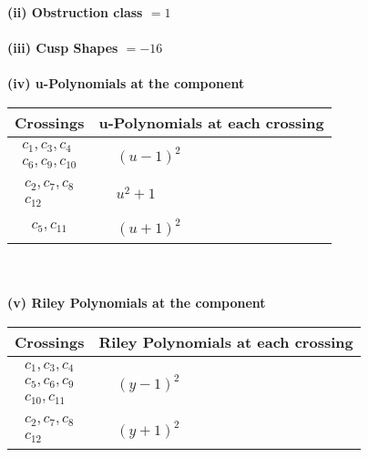 \documentclass[1p]{elsarticle_modified}
\theoremstyle{definition}
\begin{document}
\flushleft \textbf{(ii) Obstruction class $= 1$}\\~\\
\flushleft \textbf{(iii) Cusp Shapes $= -16$}\\~\\
\newpage\renewcommand{\arraystretch}{1}
\flushleft \textbf{(iv) u-Polynomials at the component}\newline \\
\begin{tabular}{m{50pt}|m{274pt}}
Crossings & \hspace{64pt}u-Polynomials at each crossing \\
\hline $$\begin{aligned}c_{1},c_{3},c_{4}\\c_{6},c_{9},c_{10}\end{aligned}$$&$\begin{aligned}
&(u-1)^2
\end{aligned}$\\
\hline $$\begin{aligned}c_{2},c_{7},c_{8}\\c_{12}\end{aligned}$$&$\begin{aligned}
&u^2+1
\end{aligned}$\\
\hline $$\begin{aligned}c_{5},c_{11}\end{aligned}$$&$\begin{aligned}
&(u+1)^2
\end{aligned}$\\
\hline
\end{tabular}\\~\\
\newpage\renewcommand{\arraystretch}{1}
\flushleft \textbf{(v) Riley Polynomials at the component}\newline \\
\begin{tabular}{m{50pt}|m{274pt}}
Crossings & \hspace{64pt}Riley Polynomials at each crossing \\
\hline $$\begin{aligned}c_{1},c_{3},c_{4}\\c_{5},c_{6},c_{9}\\c_{10},c_{11}\end{aligned}$$&$\begin{aligned}
&(y-1)^2
\end{aligned}$\\
\hline $$\begin{aligned}c_{2},c_{7},c_{8}\\c_{12}\end{aligned}$$&$\begin{aligned}
&(y+1)^2
\end{aligned}$\\
\hline
\end{tabular}\\~\\
\end{document}
